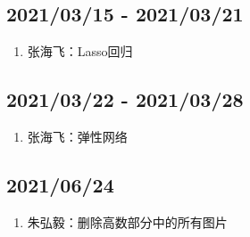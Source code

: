 \documentclass[a4paper,12pt]{article}
\begin{document}
\subsection{2021/03/15 - 2021/03/21}
\begin{enumerate}
    \item 张海飞：Lasso回归
\end{enumerate}

\subsection{2021/03/22 - 2021/03/28}
\begin{enumerate}
    \item 张海飞：弹性网络
\end{enumerate}

\subsection{2021/06/24}
\begin{enumerate}
    \item 朱弘毅：删除高数部分中的所有图片
\end{enumerate}
\end{document}
